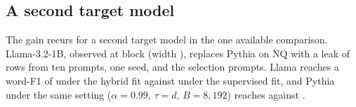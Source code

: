 \subsection{A second target model}\label{sec:attack:llama}

The gain recurs for a second target model in the one available comparison.
Llama-3.2-1B, observed at block  (width ), replaces Pythia on NQ with a leak of  rows from ten prompts, one seed, and the selection prompts. %
Llama reaches a word-F1 of  under the hybrid fit against  under the supervised fit, and Pythia under the same setting ($\alpha = 0.99$, $\tau = d$, $B = 8{,}192$) reaches  against . %

